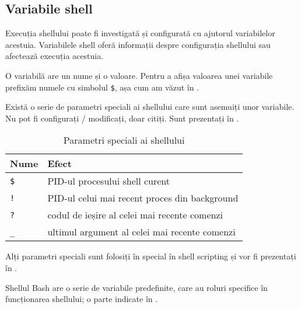 \subsection{Variabile shell}
\label{sec:cli:shell-func:vars}

Execuția shellului poate fi investigată și configurată cu ajutorul variabilelor
acestuia. Variabilele shell oferă informații despre configurația shellului sau
afectează execuția acestuia.

O variabilă are un nume și o valoare. Pentru a afișa valoarea unei variabile
prefixăm numele cu simbolul \texttt{\$}, așa cum am văzut în .

Există o serie de parametri speciali ai shellului care sunt asemuiți unor
variabile. Nu pot fi configurați / modificați, doar citiți. Sunt prezentați în .

\begin{table}[!htb]
  \caption{Parametri speciali ai shellului}
  \begin{center}
    \begin{tabular}{ p{} p{} }
      \toprule
        \textbf{Nume} &
        \textbf{Efect} \\
      \midrule
        \texttt{\$} &
        PID-ul procesului shell curent \\

        \texttt{!} &
        PID-ul celui mai recent proces din background \\

        \texttt{?} &
        codul de ieșire al celei mai recente comenzi \\

        \texttt{\_} &
        ultimul argument al celei mai recente comenzi \\
      \bottomrule
    \end{tabular}
    \label{tab:cli:special-shell-vars}
  \end{center}
\end{table}

Alți parametri speciali sunt folosiți în special în shell scripting și vor fi
prezentați în .

Shellul Bash are o serie de variabile predefinite, care au roluri specifice în
funcționarea shellului; o parte indicate în .

